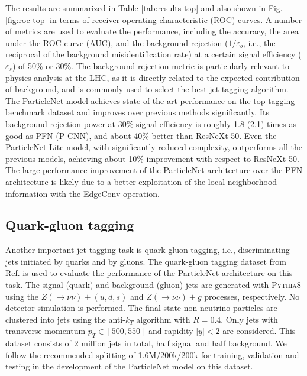 \documentclass[aps,prd,longbibliography,reprint,amsmath,amssymb,amsfonts]{revtex4-1}
\begin{document}
The results are summarized in Table \ref{tab:results-top} and also shown in Fig. \ref{fig:roc-top} in terms of receiver operating characteristic (ROC) curves. A number of metrics are used to evaluate the performance, including the accuracy, the area under the ROC curve (AUC), and the background rejection ($1/\varepsilon_{b}$, i.e., the reciprocal of the background misidentification rate) at a certain signal efficiency ($\varepsilon_{s}$) of 50\% or 30\%. The background rejection metric is particularly relevant to physics analysis at the LHC, as it is directly related to the expected contribution of background, and is commonly used to select the best jet tagging algorithm. The ParticleNet model achieves state-of-the-art performance on the top tagging benchmark dataset and improves over previous methods significantly. Its background rejection power at 30\% signal efficiency is roughly 1.8 (2.1) times as good as PFN (P-CNN), and about 40\% better than ResNeXt-50. Even the ParticleNet-Lite model, with significantly reduced complexity, outperforms all the previous models, achieving about 10\% improvement with respect to ResNeXt-50. The large performance improvement of the ParticleNet architecture over the PFN architecture is likely due to a better exploitation of the local neighborhood information with the EdgeConv operation.


\subsection{Quark-gluon tagging}
\label{sec:results-qg}

Another important jet tagging task is quark-gluon tagging, i.e., discriminating jets initiated by quarks and by gluons. The quark-gluon tagging dataset from Ref. \cite{Komiske:2018cqr} is used to evaluate the performance of the ParticleNet architecture on this task. The signal (quark) and background (gluon) jets are generated with \textsc{Pythia8} using the $Z(\rightarrow\nu\nu)+(u,d,s)$ and $Z(\rightarrow\nu\nu)+g$ processes, respectively. No detector simulation is performed. The final state non-neutrino particles are clustered into jets using the anti-$k_{T}$ algorithm \cite{Cacciari:2008gp} with $R=0.4$. Only jets with transverse momentum $p_{T}\in[500, 550]$ and rapidity $|y|<2$ are considered. This dataset consists of 2 million jets in total, half signal and half background. We follow the recommended splitting of 1.6M/200k/200k for training, validation and testing in the development of the ParticleNet model on this dataset. 
\end{document}
